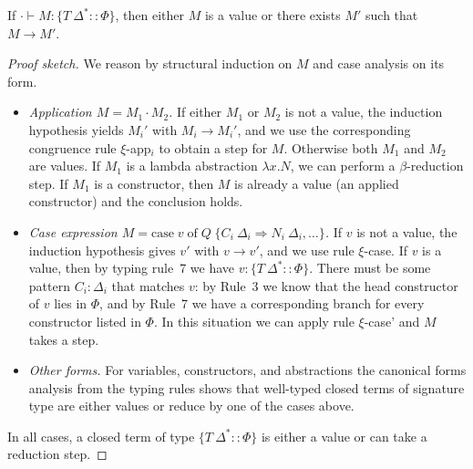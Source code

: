 \documentclass[a4paper, anonymous, UKenglish,cleveref, autoref, thm-restate]{lipics-v2021}
\begin{document}
\begin{theorem}[Progress]
If $\cdot \vdash M : \{T\:\Delta^{*} :: \Phi\}$, then either $M$ is a value or there exists $M'$ such that $M \longrightarrow M'$.
\end{theorem}
\begin{proof}[Proof sketch]
We reason by structural induction on $M$ and case analysis on its form.
\begin{itemize}
\item \emph{Application $M = M_1 \cdot M_2$.} If either $M_1$ or $M_2$ is not a value, the induction hypothesis yields $M_i'$ with $M_i \longrightarrow M_i'$, and we use the corresponding congruence rule $\xi$-app$_i$ to obtain a step for $M$. Otherwise both $M_1$ and $M_2$ are values. If $M_1$ is a lambda abstraction $\lambda x. N$, we can perform a $\beta$-reduction step. If $M_1$ is a constructor, then $M$ is already a value (an applied constructor) and the conclusion holds.
\item \emph{Case expression $M = \text{case}\;v\;\text{of}\;Q\;\{C_i\:\Delta_i \Rightarrow N_i\:\Delta_i, \ldots\}$.} If $v$ is not a value, the induction hypothesis gives $v'$ with $v \longrightarrow v'$, and we use rule $\xi$-case. If $v$ is a value, then by typing rule~7 we have $v : \{T\:\Delta^{*} :: \Phi\}$. There must be some pattern $C_i : \Delta_i$ that matches $v$: by Rule~3 we know that the head constructor of $v$ lies in $\Phi$, and by Rule~7 we have a corresponding branch for every constructor listed in $\Phi$. In this situation we can apply rule $\xi$-case' and $M$ takes a step.
\item \emph{Other forms.} For variables, constructors, and abstractions the canonical forms analysis from the typing rules shows that well-typed closed terms of signature type are either values or reduce by one of the cases above.
\end{itemize}
In all cases, a closed term of type $\{T\:\Delta^{*} :: \Phi\}$ is either a value or can take a reduction step.
\end{proof}
\end{document}

